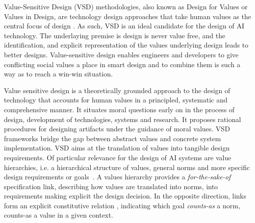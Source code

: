 \documentclass[twocolumn]{article}
\begin{document}
Value-Sensitive Design (VSD) methodologies, also known as Design for Values or Values in Design, are technology design approaches that take human values as the central focus of design \cite{friedman2006,Hoven05}. As such, VSD is an ideal candidate for the design of AI technology. The underlaying premise is design is never value free, and the identification, and explicit representation of the values underlying design leads to better designs. Value-sensitive design enables engineers and developers to give conflicting social values a place in smart design and to combine them is such a way as to reach a win-win situation. 

Value sensitive design is a theoretically grounded approach to the design of technology that accounts for human values in a principled, systematic and comprehensive manner. It situates moral questions early on in the process of design, development of technologies, systems and research. It proposes rational procedures for designing artifacts under the guidance of moral values. 
VSD frameworks bridge the gap between abstract values and concrete system implementation. VSD aims at the translation of values into tangible design requirements. Of particular relevance for the design of AI systems are value hierarchies, i.e. a hierarchical structure of values, general norms and more specific design requirements or goals~\cite{vandePoel2013}. A values hierarchy provides a \textit{for-the-sake-of} specification link, describing how values are translated into norms, into requirements making explicit the design decision. In the opposite direction, links form an explicit constitutive relation \cite{searle2010making}, indicating which goal \textit{counts-as} a norm, counts-as a value in a given context. 

\end{document}
